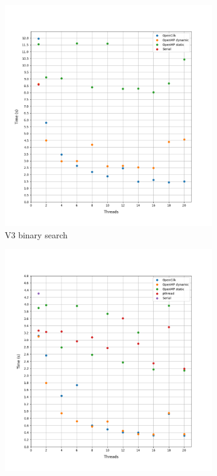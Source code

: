 \documentclass[12pt, a4paper]{article}
\begin{document}
\begin{figure}[h!]
     \begin{subfigure}[b]{0.33\textwidth}
         \centering
         \includegraphics[height=.4\textheight, width=\textwidth, keepaspectratio]{assets/youtube/v3.png}
    \caption{V3 binary search}
     \end{subfigure}
     \hfill
     \begin{subfigure}[b]{0.33\textwidth}
         \centering
         \includegraphics[height=.4\textheight, width=\textwidth, keepaspectratio]{assets/youtube/v4_binary.png}

\end{subfigure}
\end{figure}
\end{document}
